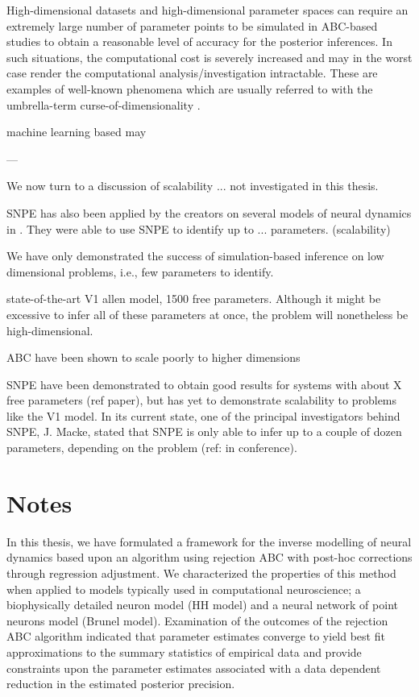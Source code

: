 High-dimensional datasets and high-dimensional parameter spaces can require an extremely large number of parameter points to be simulated in ABC-based studies to obtain a reasonable level of accuracy for the posterior inferences. In such situations, the computational cost is severely increased and may in the worst case render the computational analysis/investigation intractable. These are examples of well-known phenomena which are usually referred to with the umbrella-term curse-of-dimensionality \cite{ABCprimer}. 

machine learning based may 

---

We now turn to a discussion of scalability ... not investigated in this thesis. 

SNPE has also been applied by the creators on several models of neural dynamics in \cite{SNPE_applied}. They were able to use SNPE to identify up to ... parameters. (scalability)


We have only demonstrated the success of simulation-based inference on low dimensional problems, i.e., few parameters to identify. 

state-of-the-art V1 allen model, 1500 free parameters. Although it might be excessive to infer all of these parameters at once, the problem will nonetheless be high-dimensional. 

ABC have been shown to scale poorly to higher dimensions

SNPE have been demonstrated to obtain good results for systems with about X free parameters (ref paper), but has yet to demonstrate scalability to problems like the V1 model. In its current state, one of the principal investigators behind SNPE, J. Macke, stated that SNPE is only able to infer up to a couple of dozen parameters, depending on the problem (ref: in conference).


\section{Notes}

In this thesis, we have formulated a framework for the inverse modelling of neural dynamics based upon an algorithm using rejection ABC with post-hoc corrections through regression adjustment. We characterized the properties of this method when applied to models typically used in computational neuroscience; a biophysically detailed neuron model (HH model) and a neural network of point neurons model (Brunel model). Examination of the outcomes of the rejection ABC algorithm indicated that parameter estimates converge to yield best fit approximations to the summary statistics of empirical data and provide constraints upon the parameter estimates associated with a data dependent reduction in the estimated posterior precision. 

